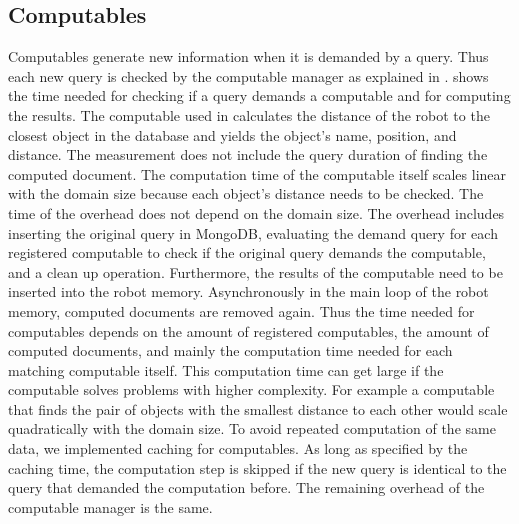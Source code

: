 \subsection{Computables}
\label{sec:eval-computables}
Computables generate new information when it is demanded by a
query. Thus each new query is checked by the computable manager as
explained in . 
shows the time needed for checking if a query demands a computable and
for computing the results. The computable used in
 calculates the distance of the robot
to the closest object in the database and yields the object's name,
position, and distance. The measurement does not include the query
duration of finding the computed document. The computation time of
the computable itself scales linear with the domain size because each
object's distance needs to be checked. The time of the overhead does
not depend on the domain size. The overhead includes inserting the
original query in MongoDB, evaluating the demand query for each
registered computable to check if the original query demands the
computable, and a clean up operation. Furthermore, the results of the
computable need to be inserted into the robot memory. Asynchronously
in the main loop of the robot memory, computed documents are removed
again. Thus the time needed for computables depends on the amount of
registered computables, the amount of computed documents, and mainly
the computation time needed for each matching computable itself. This
computation time can get large if the computable solves problems with
higher complexity. For example a computable that finds the pair of
objects with the smallest distance to each other would scale
quadratically with the domain size. To avoid repeated computation of
the same data, we implemented caching for computables. As long as
specified by the caching time, the computation step is skipped if the
new query is identical to the query that demanded the computation
before. The remaining overhead of the computable manager is the same.

